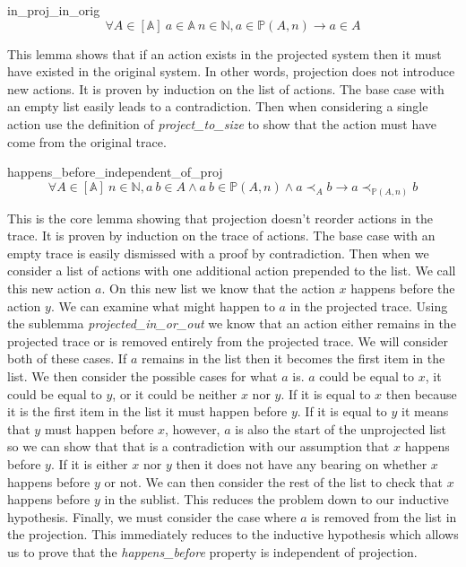 \documentclass[runningheads]{llncs}
\newcommand{\action}{\mathds{A}}
\newcommand{\listaction}{[\action]}
\newcommand{\happensbefore}{\prec_A}
\newcommand{\projectsize}[2]{\mathds{P}(#1, #2)}
\begin{document}
\begin{lemma}{in\_proj\_in\_orig}
$$ \forall A \in \listaction\ a \in \action\ n \in \mathds{N}, a \in \projectsize{A}{n} \longrightarrow  a \in A $$
\end{lemma}
This lemma shows that if an action exists in the projected system then it must have existed in the original system. In other words, projection does not introduce new actions.
 It is proven by induction on the list of actions. The base case with an empty list easily leads to a contradiction. Then when considering a single action use the definition of \emph{project\_to\_size} to show that the action must have come from the original trace. 

\begin{lemma}{happens\_before\_independent\_of\_proj}
$$ \forall A \in \listaction\ n \in \mathds{N},
a\ b \in A \wedge a\ b \in \projectsize{A}{n} \wedge a \happensbefore b \longrightarrow a \prec_{\projectsize{A}{n}} b
$$
\end{lemma}
This is the core lemma showing that projection doesn't reorder actions in the trace. It is proven by induction on the trace of actions. The base case with an empty trace is easily dismissed with a proof by contradiction. 
Then when we consider a list of actions with one additional action prepended to the list. We call this new action $a$. On this new list we know that the action $x$ happens before the action $y$.
We can examine what might happen to $a$ in the projected trace.
Using the sublemma \emph{projected\_in\_or\_out} we know that an action either remains in the projected trace or is removed entirely from the projected trace.
We will consider both of these cases.
If $a$ remains in the list then it becomes the first item in the list. 
We then consider the possible cases for what $a$ is.
$a$ could be equal to $x$, it could be equal to $y$, or it could be neither $x$ nor $y$.
If it is equal to $x$ then because it is the first item in the list it must happen before $y$.
If it is equal to $y$ it means that $y$ must happen before $x$, however, $a$ is also the start of the unprojected list so we can show that that is a contradiction with our assumption that $x$ happens before $y$.
If it is either $x$ nor $y$ then it does not have any bearing on whether $x$ happens before $y$ or not. We can then consider the rest of the list to check that $x$ happens before $y$ in the sublist. This reduces the problem down to our inductive hypothesis.
Finally, we must consider the case where $a$ is removed from the list in the projection. This immediately reduces to the inductive hypothesis which allows us to prove that the \emph{happens\_before} property is independent of projection.
\end{document}
